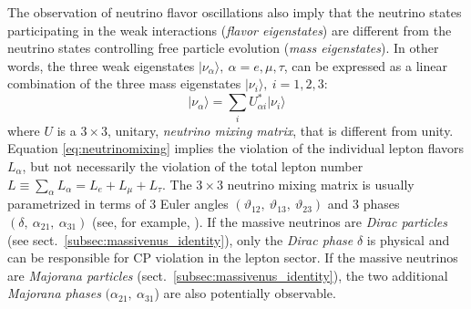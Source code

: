 The observation of neutrino flavor oscillations also imply that the neutrino states participating in the weak interactions (\emph{flavor eigenstates}) are different from the neutrino states controlling free particle evolution (\emph{mass eigenstates}). In other words, the three weak eigenstates $\lvert\nu_{\alpha}\rangle,\ \alpha=e,\mu,\tau$, can be expressed as a linear combination of the three mass eigenstates $\lvert\nu_{i}\rangle,\ i=1,2,3$:
%
\begin{equation}
\lvert \nu_{\alpha}\rangle = \sum_i U_{\alpha i}^{\ast}\lvert \nu_i\rangle
\label{eq:neutrinomixing}
\end{equation}
%
\noindent where $U$ is a $3\times3$, unitary, \emph{neutrino mixing matrix}, that is different from unity. Equation \ref{eq:neutrinomixing} implies the violation of the individual lepton flavors $L_{\alpha}$, but not necessarily the violation of the total lepton number $L\equiv \sum_{\alpha} L_{\alpha} = L_e+L_{\mu}+L_{\tau}$. The $3\times 3$ neutrino mixing matrix is usually parametrized in terms of 3 Euler angles $(\vartheta_{12},\ \vartheta_{13},\ \vartheta_{23})$ and 3 phases $(\delta,\ \alpha_{21},\ \alpha_{31})$ (see, for example, \cite{ParticleDataGroup:2022pth}). If the massive neutrinos are \emph{Dirac particles} (see sect.~\ref{subsec:massivenus_identity}), only the \emph{Dirac phase} $\delta$ is physical and can be responsible for CP violation in the lepton sector. If the massive neutrinos are \emph{Majorana particles} (sect.~\ref{subsec:massivenus_identity}), the two additional \emph{Majorana phases} $(\alpha_{21},\ \alpha_{31}$) are also potentially observable.

